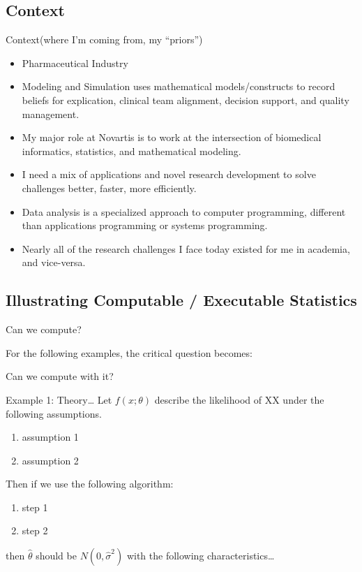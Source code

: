 \documentclass{beamer}
\begin{document}
\subsection{Context}

\begin{frame}{Context}{(where I'm coming from, my ``priors'')}
  \begin{itemize}
  \item Pharmaceutical Industry
  \item Modeling and Simulation uses mathematical models/constructs to
    record beliefs for explication, clinical team alignment, decision
    support, and quality management.
  \item My major role at Novartis is to work at the intersection of
    biomedical informatics, statistics, and mathematical modeling.
  \item I need a mix of applications and novel research development to
    solve challenges better, faster, more efficiently.
  \item Data analysis is a specialized approach to computer
    programming, \alert{different} than applications programming or
    systems programming.
  \item \alert{Nearly all of the research challenges I face today
      existed for me in academia, and vice-versa.}
  \end{itemize}
\end{frame}

\subsection{Illustrating Computable / Executable Statistics}

\begin{frame}{Can we compute?}
  
  For the following examples, the critical question becomes:
  \centerline{\alert{Can we compute with it?}}
\end{frame}


\begin{frame}[fragile]{Example 1: Theory\ldots}
  \label{example1}
  Let $f(x;\theta)$ describe the likelihood of XX under the following
  assumptions.  
  \begin{enumerate}
  \item assumption 1
  \item assumption 2
  \end{enumerate}
  Then if we use the following algorithm:
  \begin{enumerate}
  \item step 1
  \item step 2
  \end{enumerate}
  then $\hat{\theta}$ should be $N(0,\hat\sigma^2)$ with the following
  characteristics\ldots
\end{frame}
\end{document}
